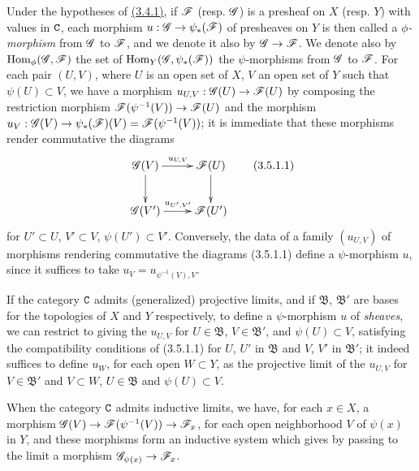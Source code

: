 \begin{env}[3.5.1]
\label{env-0.3.5.1}
Under the hypotheses of \hyperref[env-0.3.4.1]{(3.4.1)}, if $\mathscr{F}$ (resp. $\mathscr{G}$) is a
presheaf on $X$ (resp. $Y$) with values in $\mathtt{C}$, each morphism
$u:\mathscr{G}\to\psi_*(\mathscr{F})$ of presheaves on $Y$ is then called a
{\em $\phi$-morphism} from $\mathscr{G}$ to $\mathscr{F}$, and we denote it also by
$\mathscr{G}\to\mathscr{F}$. We denote also by ${\mathop{\mathrm{Hom}}\nolimits}_\phi(\mathscr{G},\mathscr{F})$ the set of
${\mathop{\mathrm{Hom}}\nolimits}_Y(\mathscr{G},\psi_*(\mathscr{F}))$ the $\psi$-morphisms from $\mathscr{G}$ to $\mathscr{F}$.
For each pair $(U,V)$, where $U$ is an open set of $X$, $V$ an open set of $Y$
such that $\psi(U)\subset V$, we have a morphism $u_{U,V}:\mathscr{G}(U)\to\mathscr{F}(U)$
by composing the restriction morphism $\mathscr{F}(\psi^{-1}(V))\to\mathscr{F}(U)$ and the
morphism $u_V:\mathscr{G}(V)\to\psi_*(\mathscr{F})(V)=\mathscr{F}(\psi^{-1}(V))$; it is
immediate that these morphisms render commutative the diagrams
\[
  \xymatrix{
    \sh{G}(V)\ar[r]^{u_{U,V}}\ar[d] &
    \sh{F}(U)\ar[d]\\
    \sh{G}(V')\ar[r]^{u_{U',V'}} &
    \sh{F}(U')
  }
  \tag{3.5.1.1}
\]
for $U'\subset U$, $V'\subset V$, $\psi(U')\subset V'$. Conversely, the data of
a family $(u_{U,V})$ of morphisms rendering commutative the diagrams (3.5.1.1)
define a $\psi$-morphism $u$, since it suffices to take
$u_V=u_{\psi^{-1}(V),V}$.

If the category $\mathtt{C}$ admits (generalized) projective limits, and if
$\mathfrak{B}$, $\mathfrak{B}'$ are bases for the topologies of $X$ and $Y$
respectively, to define a $\psi$-morphism $u$ of {\em sheaves}, we can restrict
to giving the $u_{U,V}$ for $U\in\mathfrak{B}$, $V\in\mathfrak{B}'$, and
$\psi(U)\subset V$, satisfying the compatibility conditions of (3.5.1.1) for
$U$, $U'$ in $\mathfrak{B}$ and $V$, $V'$ in $\mathfrak{B}'$; it indeed suffices
to define $u_W$, for each open $W\subset Y$, as the projective limit of the
$u_{U,V}$ for $V\in\mathfrak{B}'$ and $V\subset W$, $U\in\mathfrak{B}$ and
$\psi(U)\subset V$.

When the category $\mathtt{C}$ admits inductive limits, we have, for each $x\in X$, a
morphism $\mathscr{G}(V)\to\mathscr{F}(\psi^{-1}(V))\to\mathscr{F}_x$, for each open
neighborhood $V$ of $\psi(x)$ in $Y$, and these morphisms form an inductive
system which gives by passing to the limit a morphism
$\mathscr{G}_{\psi(x)}\to\mathscr{F}_x$.
\end{env}

